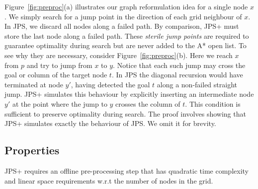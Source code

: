 Figure~\ref{fig:preproc}(a) illustrates our graph reformulation idea for a 
single node $x$. We simply search for a jump point in the direction
of each grid neighbour of $x$. In JPS, we discard all nodes along a failed
path. By comparison, JPS+ must store the last node along a failed path.
These \emph{sterile jump points} are required 
to guarantee optimality during search but are never added to the A* open list.
To see why they are necessary, consider Figure~\ref{fig:preproc}(b).
Here we reach $x$ from $p$ and try to jump from $x$ to $y$. 
Notice that each such jump may cross the goal or column of the target node
$t$. In JPS the diagonal recursion would have terminated at node $y'$, having detected
the goal $t$ along a non-failed straight jump.
JPS+ simulates this behaviour by explicitly inserting an intermediate node $y'$ 
at the point where the jump to $y$ crosses the column of $t$.
This condition is sufficient to preserve optimality during search. The proof
involves showing that JPS+ simulates exactly the behaviour of JPS. We omit it 
for brevity.

\subsection{Properties}
JPS+ requires an offline pre-processing step that has quadratic time complexity
and linear space requirements w.r.t the number of nodes in the grid.


